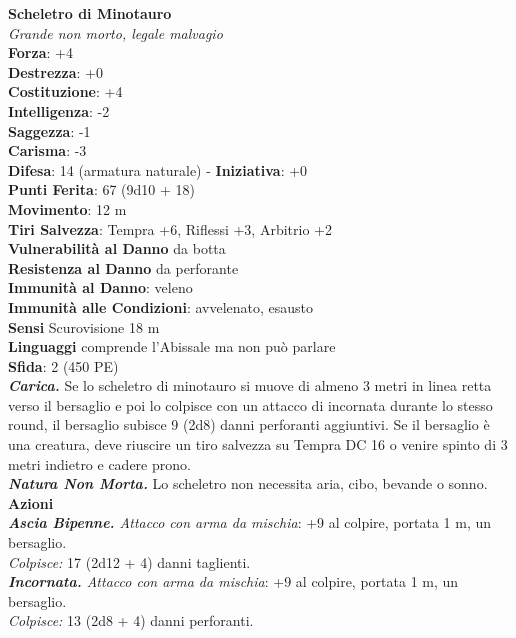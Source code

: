 \begin{multicols}{2}
\medskip\textbf{Scheletro di Minotauro}\\
\emph{Grande non morto, legale malvagio}\\
\textbf{Forza}: +4\\
\textbf{Destrezza}: +0\\
\textbf{Costituzione}: +4\\
\textbf{Intelligenza}: -2\\
\textbf{Saggezza}: -1\\
\textbf{Carisma}: -3\\
\textbf{Difesa}: 14 (armatura naturale) - \textbf{Iniziativa}: +0\\
\textbf{Punti Ferita}: 67 (9d10 + 18)\\
\textbf{Movimento}: 12 m\\
\textbf{Tiri Salvezza}: Tempra +6, Riflessi +3, Arbitrio +2\\
\textbf{Vulnerabilità al Danno} da botta\\
\textbf{Resistenza al Danno} da perforante\\
\textbf{Immunità al Danno}: veleno\\
\textbf{Immunità alle Condizioni}: avvelenato, esausto\\
\textbf{Sensi} Scurovisione 18 m\\
\textbf{Linguaggi} comprende l'Abissale ma non può parlare\\
\textbf{Sfida}: 2 (450 PE)\smallskip\\
\emph{\textbf{Carica.}} Se lo scheletro di minotauro si muove di almeno 3 metri in linea retta verso il bersaglio e poi lo colpisce con un attacco di incornata durante lo stesso round, il bersaglio subisce 9 (2d8) danni perforanti aggiuntivi. Se il bersaglio è una creatura, deve riuscire un tiro salvezza su Tempra DC  16 o venire spinto di 3 metri indietro e cadere prono.\\
\emph{\textbf{Natura Non Morta.}} Lo scheletro non necessita aria, cibo, bevande o sonno.\\
\smallskip\textbf{Azioni}\\
\emph{\textbf{Ascia Bipenne.} Attacco con arma da mischia}: +9 al colpire, portata 1 m, un bersaglio.\\
\emph{Colpisce:} 17 (2d12 + 4) danni taglienti.\\
\emph{\textbf{Incornata.} Attacco con arma da mischia}: +9 al colpire, portata 1 m, un bersaglio.\\
\emph{Colpisce:} 13 (2d8 + 4) danni perforanti.\\


\end{multicols}
